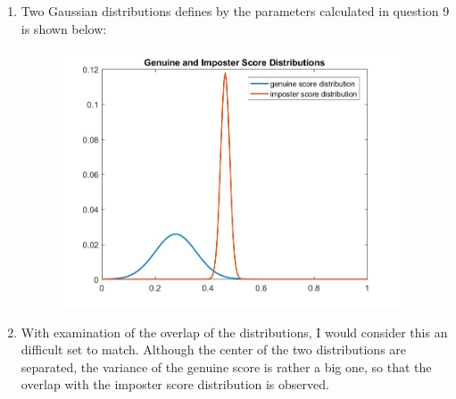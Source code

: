 \documentclass[a4paper]{article}
\begin{document}
\begin{spacing}{2.0}
\begin{enumerate}
	\item Two Gaussian distributions defines by the parameters calculated in question 9 is shown below:
	\begin{figure}[H]
	\centering
	\includegraphics[width = 4in]{filtered_scoreDis.jpg}
	\end{figure}
	
	\item With examination of the overlap of the distributions, I would consider this an difficult set to match. Although the center of the two distributions are separated, the variance of the genuine score is rather a big one, so that the overlap with the imposter score distribution is observed.
	

\end{enumerate}
\end{spacing}
\end{document}
